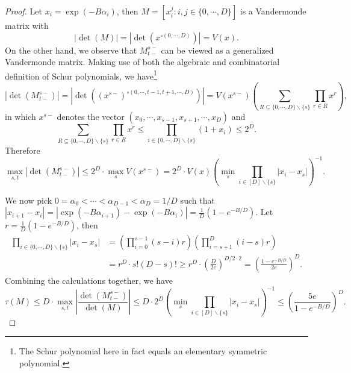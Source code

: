 \begin{proof}
Let $x_i = \exp(-B\alpha_i)$, then
$M = [x_i^j: i, j \in \{0, \cdots, D\}]$ is a Vandermonde matrix with
\[|\det(M)| = |\det(x^{\circ(0, \cdots, D)})| = V(x).\]
On the other hand, we observe that $M_{t-}^{s-}$ can be viewed as a generalized Vandermonde matrix. Making use of both the algebraic and combinatorial definition of Schur polynomials, we have\footnote{The Schur polynomial here in fact equals an elementary symmetric polynomial.}
\[|\det (M_{t-}^{s-})| = |\det((x^{s-})^{\circ(0, \cdots, t-1, t+1, \cdots, D)})|
= V(x^{s-}) \left( \sum_{R\subseteq \{0, \cdots, D\}\backslash\{s\}}\prod_{r\in R}x^r \right),\]
in which $x^{s-}$ denotes the vector $(x_0, \cdots, x_{s-1}, x_{s+1}, \cdots, x_D)$ and
\[\sum_{R\subseteq \{0, \cdots, D\}\backslash\{s\}}\prod_{r\in R}x^r 
\le \prod_{i \in \{0, \cdots, D\} \backslash \{s\}}(1 + x_i) \le 2^D.\]
Therefore
\[\max_{s, t} |\det (M_{t-}^{s-})|
\le 2^D \cdot \max_s V(x^{s-}) = 2^D \cdot V(x)
\left( \min_s \prod_{i \in [D]\backslash \{s\}} |x_i - x_s| \right)^{-1}. \]

We now pick $0 = \alpha_0 < \cdots < \alpha_{D-1} < \alpha_{D} = 1/D$ such that
$|x_{i+1} - x_i| = |\exp(-B\alpha_{i+1}) - \exp(-B\alpha_i)|
= \frac 1{D}(1 - e^{-B/D})$. Let $r = \frac 1{D}(1 - e^{-B/D})$, then
\begin{align*}
\prod_{i \in \{0, \cdots, D\} \backslash \{s\}} |x_i - x_s|
&= \left(\prod_{i=0}^{s-1} (s - i) r \right)
\left(\prod_{i=s+1}^{D} (i-s) r\right) \\
&= r^{D} \cdot s! (D-s)!
\ge r^{D} \cdot (\frac{D}{2e})^{D/2 \cdot 2} = (\frac{1 - e^{-B/D}}{2e})^{D}.
\end{align*}
Combining the calculations together, we have
\[\tau(M) \le D \cdot \max_{s, t}\left|\frac{\det(M^{s-}_{t-})}{\det(M)}\right| 
\le D \cdot 2^D\left( \min_s \prod_{i \in [D]\backslash \{s\}} |x_i - x_s| \right)^{-1} \le \left(\frac{5e}{1 - e^{-B/D}}\right)^D.\]
\end{proof}

